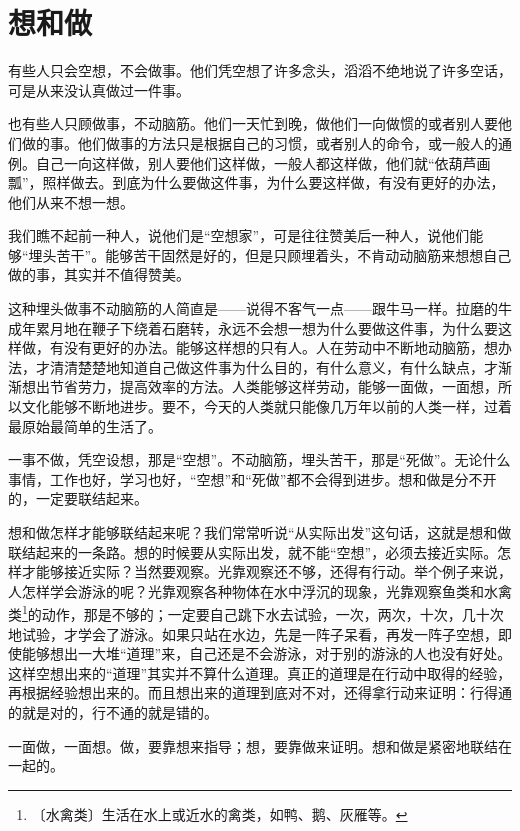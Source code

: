 \documentclass[12pt,UTF-8,openany]{ctexbook}
\begin{document}
\chapter{想和做}

\begin{large}
    
    有些人只会空想，不会做事。他们凭空想了许多念头，滔滔不绝地说了许多空话，可是从来没认真做过一件事。
    
    也有些人只顾做事，不动脑筋。他们一天忙到晚，做他们一向做惯的或者别人要他们做的事。他们做事的方法只是根据自己的习惯，或者别人的命令，或一般人的通例。自己一向这样做，别人要他们这样做，一般人都这样做，他们就“依葫芦画瓢”，照样做去。到底为什么要做这件事，为什么要这样做，有没有更好的办法，他们从来不想一想。
    
    我们瞧不起前一种人，说他们是“空想家”，可是往往赞美后一种人，说他们能够“埋头苦干”。能够苦干固然是好的，但是只顾埋着头，不肯动动脑筋来想想自己做的事，其实并不值得赞美。
    
    这种埋头做事不动脑筋的人简直是——说得不客气一点——跟牛马一样。拉磨的牛成年累月地在鞭子下绕着石磨转，永远不会想一想为什么要做这件事，为什么要这样做，有没有更好的办法。能够这样想的只有人。人在劳动中不断地动脑筋，想办法，才清清楚楚地知道自己做这件事为什么目的，有什么意义，有什么缺点，才渐渐想出节省劳力，提高效率的方法。人类能够这样劳动，能够一面做，一面想，所以文化能够不断地进步。要不，今天的人类就只能像几万年以前的人类一样，过着最原始最简单的生活了。
    
    一事不做，凭空设想，那是“空想”。不动脑筋，埋头苦干，那是“死做”。无论什么事情，工作也好，学习也好，“空想”和“死做”都不会得到进步。想和做是分不开的，一定要联结起来。
    
    想和做怎样才能够联结起来呢？我们常常听说“从实际出发”这句话，这就是想和做联结起来的一条路。想的时候要从实际出发，就不能“空想”，必须去接近实际。怎样才能够接近实际？当然要观察。光靠观察还不够，还得有行动。举个例子来说，人怎样学会游泳的呢？光靠观察各种物体在水中浮沉的现象，光靠观察鱼类和水禽类\footnote{〔水禽类〕生活在水上或近水的禽类，如鸭、鹅、灰雁等。}的动作，那是不够的；一定要自己跳下水去试验，一次，两次，十次，几十次地试验，才学会了游泳。如果只站在水边，先是一阵子呆看，再发一阵子空想，即使能够想出一大堆“道理”来，自己还是不会游泳，对于别的游泳的人也没有好处。这样空想出来的“道理”其实并不算什么道理。真正的道理是在行动中取得的经验，再根据经验想出来的。而且想出来的道理到底对不对，还得拿行动来证明：行得通的就是对的，行不通的就是错的。
    
    一面做，一面想。做，要靠想来指导；想，要靠做来证明。想和做是紧密地联结在一起的。
    

\end{large}
\end{document}
